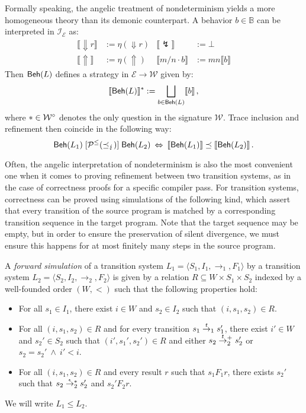 \documentclass[acmsmall,review,anonymous]{acmart}\settopmatter{printfolios=true,printccs=false,printacmref=false}
\begin{document}
Formally speaking,
the angelic treatment of nondeterminism
yields a more homogeneous theory
than its demonic counterpart.
A behavior $b \in \mathbb{B}$ can be interpreted
in $\mathcal{I}_\mathcal{E}$ as:
\begin{align*}
  \llbracket {\Downarrow}r \rrbracket &:= \eta({\Downarrow} r) &
  \llbracket {\lightning} \rrbracket &:= \bot \\
  \llbracket {\Uparrow} \rrbracket &:= \eta({\Uparrow}) &
  \llbracket m / n \cdot b \rrbracket &:=
    m n \llbracket b \rrbracket
\end{align*}
Then $ \mathsf{Beh} (L)$ defines a strategy
in $\mathcal{E} \rightarrow \mathcal{W}$ given by:
\[
  \llbracket  \mathsf{Beh} (L) \rrbracket^* :=
    \bigsqcup_{b \in  \mathsf{Beh} (L)} \llbracket b \rrbracket
  \,,
\]
where $* \in \mathcal{W}^\circ$ denotes the only question
in the signature $\mathcal{W}$.
Trace inclusion and refinement then
coincide in the following way:
\[
   \mathsf{Beh} (L_1)
  \mathrel{[{\mathcal{P}^\le({\preceq_\lightning})}]}
   \mathsf{Beh} (L_2)
  \: \Leftrightarrow \:
  \llbracket  \mathsf{Beh} (L_1) \rrbracket
  \preceq
  \llbracket  \mathsf{Beh} (L_2) \rrbracket
  \,.
\]

Often,
the angelic interpretation of nondeterminism
is also the most convenient one
when it comes to proving refinement between
two transition systems,
as in the case of correctness proofs for
a specific compiler pass.
For transition systems,
correctness can be proved using simulations of the following kind,
which assert that every transition of the source program
is matched by a corresponding transition sequence in the target program.
Note that the target sequence may be empty,
but in order to ensure the preservation of silent divergence,
we must ensure this happens for at most
finitely many steps in the source program.

\begin{definition}
A \emph{forward simulation}
of a transition system
$L_1 = \langle S_1, I_1, {\rightarrow}_1, F_1 \rangle$
by a transition system
$L_2 = \langle S_2, I_2, {\rightarrow}_2, F_2 \rangle$
is given by a relation $R \subseteq W \times S_1 \times S_2$
indexed by a well-founded order $(W, {<})$
such that the following properties hold:
\begin{itemize}
  \item For all $s_1 \in I_1$,
    there exist $i \in W$ and $s_2 \in I_2$
    such that $(i, s_1, s_2) \in R$.
  \item For all $(i, s_1, s_2) \in R$
    and for every transition
    $s_1 \mathrel{\smash{\stackrel{t}{\rightarrow}}_1} s_1'$,
    there exist $i' \in W$ and $s_2' \in S_2$
    such that $(i', s_1', s_2') \in R$ and either
    $s_2 \mathrel{\smash{\stackrel{t}{\rightarrow}}_2^+} s_2'$ or
    $s_2 = s_2' \:\wedge\: i' < i$.
  \item For all $(i, s_1, s_2) \in R$
    and every result $r$ such that $s_1 \mathrel{F_1} r$,
    there exists $s_2'$ such that
    $s_2 \mathrel{\smash{\stackrel{\epsilon}{\rightarrow}}_2^*} s_2'$ and
    $s_2' \mathrel{F_2} r$.
\end{itemize}
We will write $L_1 \le L_2$.
\end{definition}
\end{document}
